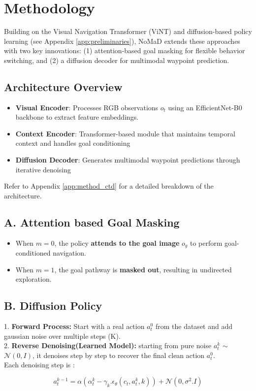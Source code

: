 \documentclass[12pt]{article}
\begin{document}
\section{Methodology}
Building on the Visual Navigation Transformer (ViNT) \cite{vint} and diffusion-based policy learning (see Appendix \ref{app:preliminaries}), NoMaD extends these approaches with two key innovations: (1) attention-based goal masking for flexible behavior switching, and (2) a diffusion decoder for multimodal waypoint prediction.
\subsection*{Architecture Overview}
\label{subsec:architecture}

\begin{itemize}
    \item \textbf{Visual Encoder}: Processes RGB observations $o_t$ using an EfficientNet-B0 backbone to extract feature embeddings.
    \item \textbf{Context Encoder}: Transformer-based module that maintains temporal context and handles goal conditioning
    \item \textbf{Diffusion Decoder}: Generates multimodal waypoint predictions through iterative denoising
\end{itemize}
Refer to Appendix \ref{app:method_ctd} for a detailed breakdown of the architecture.\\
\subsection*{A. Attention based Goal Masking}
\label{subsec:goal_masking}
\begin{itemize}
    \item When $m = 0$, the policy \textbf{attends to the goal image} $o_g$ to perform goal-conditioned navigation.
    \item When $m = 1$, the goal pathway is \textbf{masked out}, resulting in undirected exploration.
\end{itemize}
\subsection*{B. Diffusion Policy}
1. \textbf{Forward Process:} Start with a real action $a^{0}_t$ from the dataset and add gaussian noise over multiple steps (K). \\
2. \textbf{Reverse Denoising(Learned Model):} starting from pure noise $a^{k}_t$ $\sim$ $\mathcal{N}(0,I)$, it denoises step by step to recover the final clean action $a^{0}_t$.\\
Each denoising step is :
\begin{center}
    \[a^{k-1}_t = \alpha(\alpha^{k}_t-\gamma_k.\epsilon_{\theta}(c_t, a^{k}_t,k)) + \mathcal{N}(0,\sigma^2.I)\]
\end{center}
\end{document}
